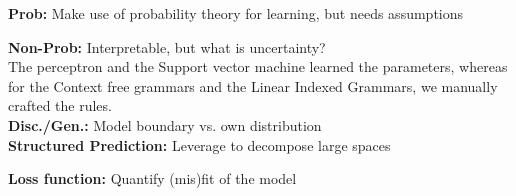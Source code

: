 \textbf{Prob:} Make use of probability theory for learning, but needs assumptions\\
\begin{comment}
	In this class, we saw the discriminative approach, e.g. Conditional Random Fields and Recurrent Neural Networks. Also the generative approach, e.g. N-gram Models, Markov Random Fields and Recurrent Neural Networks.\\
\end{comment} 

\textbf{Non-Prob:} Interpretable, but what is uncertainty?\\
The perceptron and the Support vector machine learned the parameters, whereas for the Context free grammars and the Linear Indexed Grammars, we manually crafted the rules.\\

\textbf{Disc./Gen.:} Model boundary vs. own distribution\\

\textbf{Structured Prediction:} Leverage to decompose large spaces\\
\begin{comment}
	We saw locally normalised and globally normalised structured predictions.\\
	Local normalisation is efficient to train, since only the prediction at the current state matters, but they lead to biased predictions.\\
	Global normalisation weights the scores at each timestep independently, but one needs to compute a global normalisation constant.\\
	Key is most of the time the independence assumption. If we don't make them the model parameters may explode.\\
	It is often good and performance increasing to include assumptions about the problem we have.\\
\end{comment}

\textbf{Loss function:} Quantify (mis)fit of the model\\
\begin{comment}
	The Model does not imply the loss function, we have different options. 
	It always depends on what we want to achieve.
	We try to quantify the goodness through the loss function.\\
	\textbf{Common Properties:} Convexity, Differentiability, Guarantees, complexity..\\
	\textbf{MLE:} Minimising $-\log p(D|\theta)$ is efficient to evaluate and has lowest KL-Divergence.
	It can easily overfit on limited data.\\
\end{comment}

